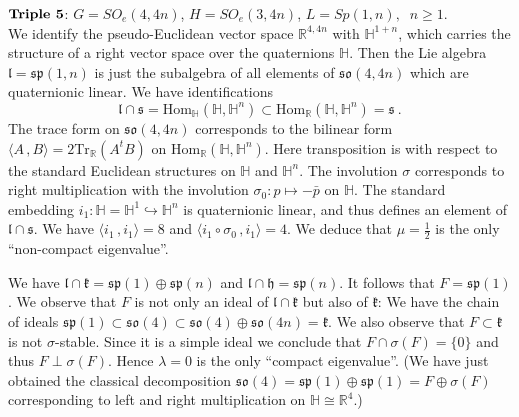 \documentclass[10]{amsart}
\theoremstyle{remark}
\theoremstyle{definition}
\numberwithin{equation}{section}
\newcommand{\R}{\mathbb{R}}           %
\newcommand{\HH}{{\mathbb{H}}}           %
\newcommand{\Tr}{\text{Tr}}
\newcommand{\Hom}{\mathrm{Hom}}
\newcommand{\fsp}{{\mathfrak{sp}}}
\newcommand{\fh}{{\mathfrak h}}
\newcommand{\fk}{{\mathfrak k}}
\newcommand{\fl}{{\mathfrak l}}
\newcommand{\fo}{{\mathfrak{so}}}
\newcommand{\fs}{{\mathfrak s}}
\newcommand{\IP}[2]{\langle#1\,, #2\rangle}     %
\begin{document}
{%
\underline{$\text{\bf Triple 5}$}: $G=SO_e(4,4n)$, $H=SO_e(3,4n)$, $L=Sp(1,n),\;\; n\geq 1$.\\
We identify the pseudo-Euclidean vector space $\R^{4,4n}$ with $\HH^{1+n}$, which carries the structure of a right vector space over the quaternions $\HH$.
Then the Lie algebra $\fl=\fsp(1,n)$ is just the subalgebra of all elements of $\fo(4,4n)$ which are quaternionic linear.
We have identifications
$$  \fl\cap \fs=\Hom_\HH(\HH,\HH^n)\subset \Hom_\R(\HH,\HH^n)=\fs\ .$$
The trace form on $\fo(4,4n)$ corresponds to the bilinear form $\IP{A}{B}=2\Tr_\R(A^t B)$ on $\Hom_\R(\HH,\HH^n)$. Here transposition is with respect to the standard
Euclidean structures on $\HH$ and $\HH^n$. The involution $\sigma$ corresponds to right multiplication with the involution $\sigma_0:p\mapsto -\bar p$ on $\HH$.
The standard embedding $i_1: \HH=\HH^1\hookrightarrow\HH^n$ is quaternionic linear, and thus defines an element of $\fl\cap\fs$.
We have $\IP{i_1}{i_1}=8$ and $\IP{i_1\circ \sigma_0}{i_1}=4$.
We deduce that $\mu=\frac{1}{2}$ is the only ``non-compact eigenvalue''. 

We have $\fl\cap \fk=\fsp(1)\oplus\fsp(n)$ and $\fl\cap \fh=\fsp(n)$. It follows that $F=\fsp(1)$. We observe that $F$ is not only an ideal of $\fl\cap\fk$ but also of
$\fk$: We have the chain of ideals $\fsp(1)\subset\fo(4)\subset\fo(4)\oplus \fo(4n)=\fk$. We also observe that $F\subset \fk$ is not $\sigma$-stable. Since it is a simple
ideal we conclude that $F\cap \sigma(F)=\{0\}$ and thus $F\perp \sigma(F)$. Hence $\lambda=0$ is the only ``compact eigenvalue''. (We have just obtained the classical decomposition $\fo(4)=\fsp(1)\oplus\fsp(1)=F\oplus\sigma(F)$ corresponding to left and right multiplication on $\HH\cong\R^4$.)
\vspace*{0.3cm}

}
\end{document}
